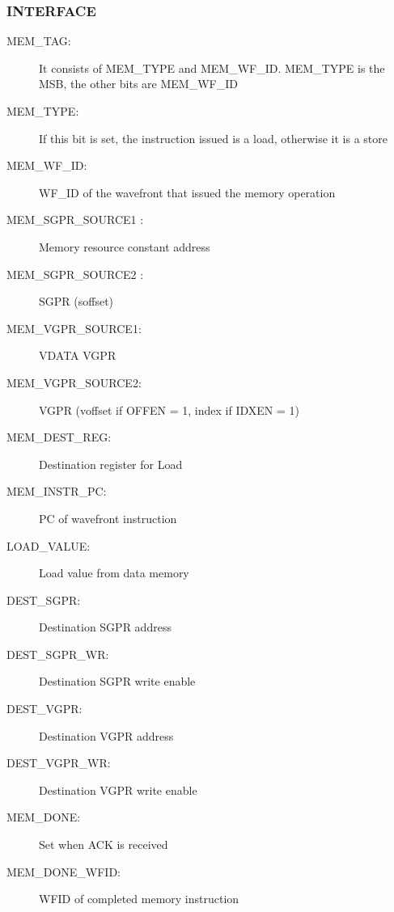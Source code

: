 \documentclass{article}
\begin{document}
\subsubsection{INTERFACE}
\begin{description}
\item[MEM\_TAG:] It consists of MEM\_TYPE and MEM\_WF\_ID. MEM\_TYPE is the MSB, the other bits are MEM\_WF\_ID
\item[MEM\_TYPE:] If this bit is set, the instruction issued is a load, otherwise it is a store 
\item[MEM\_WF\_ID:] WF\_ID of the wavefront that issued the memory operation
\item[MEM\_SGPR\_SOURCE1 :] Memory resource constant address
\item[MEM\_SGPR\_SOURCE2 :] SGPR (soffset)
\item[MEM\_VGPR\_SOURCE1:] VDATA VGPR 
\item[MEM\_VGPR\_SOURCE2:] VGPR (voffset if OFFEN = 1, index if IDXEN = 1)
\item[MEM\_DEST\_REG:] Destination register for Load 
\item[MEM\_INSTR\_PC:] PC of wavefront instruction
\item[LOAD\_VALUE:] Load value from data memory
\item[DEST\_SGPR:] Destination SGPR address
\item[DEST\_SGPR\_WR:] Destination SGPR write enable
\item[DEST\_VGPR:] Destination VGPR address 
\item[DEST\_VGPR\_WR:] Destination VGPR write enable
\item[MEM\_DONE:] Set when ACK is received
\item[MEM\_DONE\_WFID:] WFID of completed memory instruction
\end{description}
\end{document}
